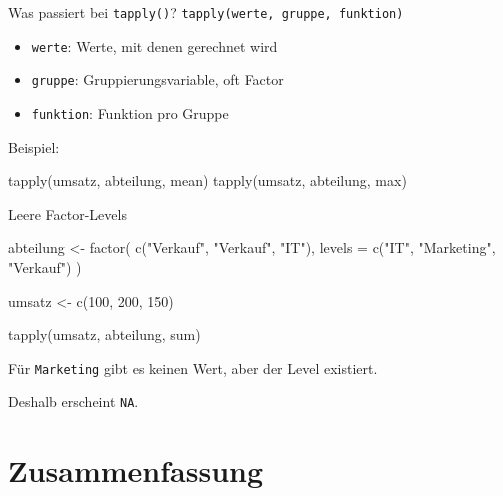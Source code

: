 \documentclass[
  10pt,
  ignorenonframetext,
  aspectratio=169,
]{beamer}
\newenvironment{Shaded}{}{}
\newcommand{\AttributeTok}[1]{\textcolor[rgb]{0.49,0.56,0.16}{#1}}
\newcommand{\DecValTok}[1]{\textcolor[rgb]{0.25,0.63,0.44}{#1}}
\newcommand{\FunctionTok}[1]{\textcolor[rgb]{0.02,0.16,0.49}{#1}}
\newcommand{\NormalTok}[1]{#1}
\newcommand{\OtherTok}[1]{\textcolor[rgb]{0.00,0.44,0.13}{#1}}
\newcommand{\StringTok}[1]{\textcolor[rgb]{0.25,0.44,0.63}{#1}}
\providecommand{\tightlist}{%
  \setlength{\itemsep}{0pt}\setlength{\parskip}{0pt}}
\begin{document}
\begin{frame}[fragile]{Was passiert bei \texttt{tapply()}?}
\label{was-passiert-bei-tapply}
\texttt{tapply(werte,\ gruppe,\ funktion)}

\begin{itemize}
\tightlist
\item
  \texttt{werte}: Werte, mit denen gerechnet wird
\item
  \texttt{gruppe}: Gruppierungsvariable, oft Factor
\item
  \texttt{funktion}: Funktion pro Gruppe
\end{itemize}

Beispiel:

\begin{Shaded}
\begin{Highlighting}[]
\FunctionTok{tapply}\NormalTok{(umsatz, abteilung, mean)}
\FunctionTok{tapply}\NormalTok{(umsatz, abteilung, max)}
\end{Highlighting}
\end{Shaded}
\end{frame}

\begin{frame}[fragile]{Leere Factor-Levels}
\label{leere-factor-levels}
\begin{Shaded}
\begin{Highlighting}[]
\NormalTok{abteilung }\OtherTok{\textless{}{-}} \FunctionTok{factor}\NormalTok{(}
  \FunctionTok{c}\NormalTok{(}\StringTok{"Verkauf"}\NormalTok{, }\StringTok{"Verkauf"}\NormalTok{, }\StringTok{"IT"}\NormalTok{),}
  \AttributeTok{levels =} \FunctionTok{c}\NormalTok{(}\StringTok{"IT"}\NormalTok{, }\StringTok{"Marketing"}\NormalTok{, }\StringTok{"Verkauf"}\NormalTok{)}
\NormalTok{)}

\NormalTok{umsatz }\OtherTok{\textless{}{-}} \FunctionTok{c}\NormalTok{(}\DecValTok{100}\NormalTok{, }\DecValTok{200}\NormalTok{, }\DecValTok{150}\NormalTok{)}

\FunctionTok{tapply}\NormalTok{(umsatz, abteilung, sum)}
\end{Highlighting}
\end{Shaded}

Für \texttt{Marketing} gibt es keinen Wert, aber der Level existiert.

Deshalb erscheint \texttt{NA}.
\end{frame}

\section{Zusammenfassung}\label{zusammenfassung}
\end{document}
